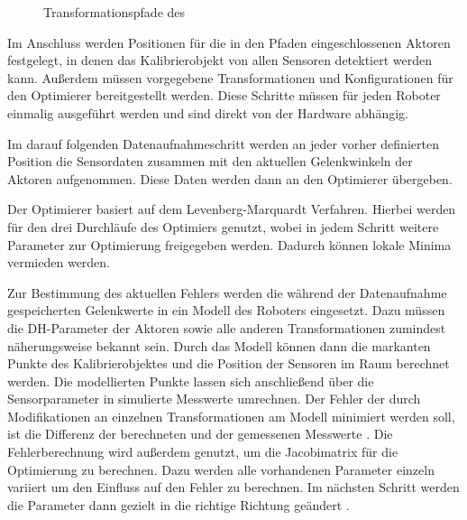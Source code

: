 \begin{figure}[Htbp] \centering {}
   \caption{Transformationspfade des \cob} \label{fig:pfade} \end{figure}

Im Anschluss werden Positionen für die in den Pfaden eingeschlossenen Aktoren
festgelegt, in denen das Kalibrierobjekt von allen Sensoren detektiert werden
kann. Außerdem müssen vorgegebene Transformationen und Konfigurationen für den
Optimierer bereitgestellt werden. Diese Schritte müssen für jeden Roboter
einmalig ausgeführt werden und sind direkt von der Hardware abhängig. 

Im darauf folgenden Datenaufnahmeschritt werden an jeder vorher definierten
Position die Sensordaten zusammen mit den aktuellen Gelenkwinkeln der Aktoren
aufgenommen. Diese Daten werden dann an den Optimierer übergeben.

Der Optimierer basiert auf dem Levenberg-Marquardt Verfahren\cite[Abschnitt 1]{pr2_estimation}.
Hierbei werden
für den \cob drei Durchläufe des Optimiers genutzt, wobei in jedem Schritt
weitere Parameter zur Optimierung freigegeben werden. Dadurch können lokale
Minima vermieden werden.

Zur Bestimmung des aktuellen Fehlers werden die während der Datenaufnahme
gespeicherten Gelenkwerte in ein Modell des Roboters eingesetzt. Dazu müssen
die \ac{DH-Parameter} der Aktoren sowie alle anderen Transformationen zumindest
näherungsweise bekannt sein. Durch das Modell können dann die markanten Punkte
des Kalibrierobjektes und die Position der Sensoren im Raum berechnet werden.
Die modellierten Punkte lassen sich anschließend über die Sensorparameter in
simulierte Messwerte umrechnen. Der Fehler der durch Modifikationen an einzelnen
Transformationen am Modell minimiert werden soll, ist die Differenz der
berechneten und der gemessenen Messwerte \cite{levi2012autonomous}.
Die Fehlerberechnung wird außerdem genutzt, um die Jacobimatrix für die Optimierung zu berechnen. Dazu werden alle
vorhandenen Parameter einzeln variiert um den Einfluss auf den Fehler zu berechnen.
Im nächsten Schritt werden die Parameter dann gezielt in die richtige Richtung
geändert \cite{forsyth2011}.



